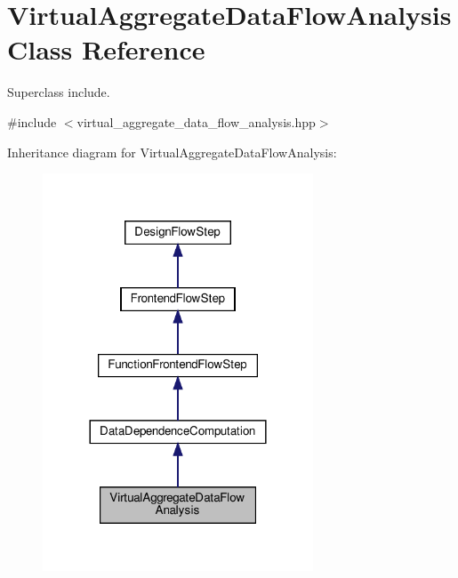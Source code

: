 \hypertarget{classVirtualAggregateDataFlowAnalysis}{}\section{Virtual\+Aggregate\+Data\+Flow\+Analysis Class Reference}
\label{classVirtualAggregateDataFlowAnalysis}


Superclass include.  




{\ttfamily \#include $<$virtual\+\_\+aggregate\+\_\+data\+\_\+flow\+\_\+analysis.\+hpp$>$}



Inheritance diagram for Virtual\+Aggregate\+Data\+Flow\+Analysis\+:
\nopagebreak
\begin{figure}[H]
\begin{center}
\leavevmode
\includegraphics[width=228pt]{d9/d6f/classVirtualAggregateDataFlowAnalysis__inherit__graph}
\end{center}
\end{figure}


